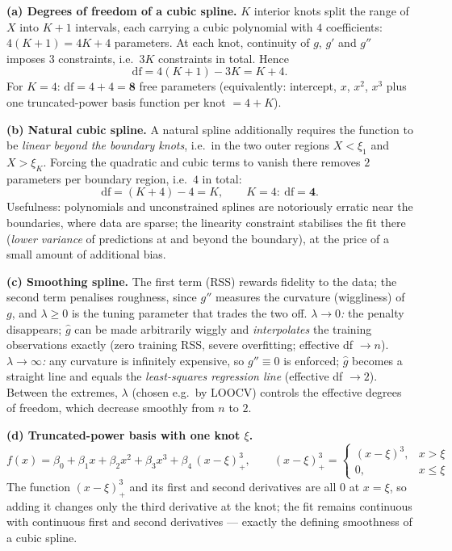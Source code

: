 \documentclass[11pt,a4paper]{article}
\begin{document}
\ifdefined\withsolutions
\begin{solutionbox}
\textbf{(a) Degrees of freedom of a cubic spline.}
$K$ interior knots split the range of $X$ into $K+1$ intervals, each carrying a cubic
polynomial with $4$ coefficients: $4(K+1)=4K+4$ parameters. At each knot, continuity of
$g$, $g'$ and $g''$ imposes $3$ constraints, i.e.\ $3K$ constraints in total. Hence
\[
  \mathrm{df}=4(K+1)-3K=K+4 .
\]
For $K=4$: $\mathrm{df}=4+4=\mathbf{8}$ free parameters (equivalently: intercept, $x$, $x^2$,
$x^3$ plus one truncated-power basis function per knot $=4+K$).

\medskip
\textbf{(b) Natural cubic spline.}
A natural spline additionally requires the function to be \emph{linear beyond the boundary
knots}, i.e.\ in the two outer regions $X<\xi_1$ and $X>\xi_K$. Forcing the quadratic and cubic
terms to vanish there removes $2$ parameters per boundary region, i.e.\ $4$ in total:
\[
  \mathrm{df}=(K+4)-4=K,\qquad K=4:\ \mathrm{df}=\mathbf{4}.
\]
Usefulness: polynomials and unconstrained splines are notoriously erratic near the boundaries,
where data are sparse; the linearity constraint stabilises the fit there
(\emph{lower variance} of predictions at and beyond the boundary), at the price of a small
amount of additional bias.

\medskip
\textbf{(c) Smoothing spline.}
The first term (RSS) rewards fidelity to the data; the second term penalises roughness, since
$g''$ measures the curvature (wiggliness) of $g$, and $\lambda\ge 0$ is the tuning parameter
that trades the two off.
\emph{$\lambda\to 0$:} the penalty disappears; $\hat{g}$ can be made arbitrarily wiggly and
\emph{interpolates} the training observations exactly (zero training RSS, severe overfitting;
effective df $\to n$).
\emph{$\lambda\to\infty$:} any curvature is infinitely expensive, so $g''\equiv 0$ is enforced;
$\hat{g}$ becomes a straight line and equals the \emph{least-squares regression line}
(effective df $\to 2$). Between the extremes, $\lambda$ (chosen e.g.\ by LOOCV) controls the
effective degrees of freedom, which decrease smoothly from $n$ to $2$.

\medskip
\textbf{(d) Truncated-power basis with one knot $\xi$.}
\[
  f(x)=\beta_0+\beta_1x+\beta_2x^2+\beta_3x^3+\beta_4\,(x-\xi)^3_+,
  \qquad
  (x-\xi)^3_+=\begin{cases}(x-\xi)^3, & x>\xi\\[0.5mm] 0, & x\le\xi\end{cases}
\]
The function $(x-\xi)^3_+$ and its first and second derivatives are all $0$ at $x=\xi$, so
adding it changes only the third derivative at the knot; the fit remains continuous with
continuous first and second derivatives --- exactly the defining smoothness of a cubic spline.
\end{solutionbox}
\fi
\end{document}
